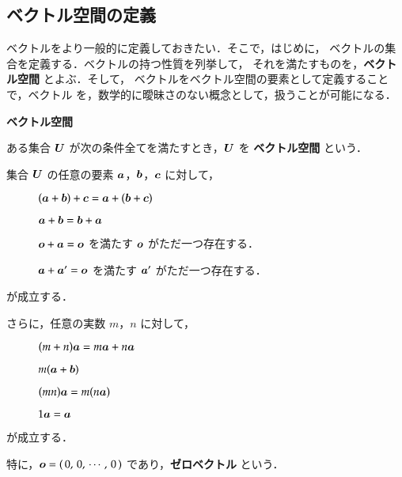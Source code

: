            \subsection{ベクトル空間の定義}
                ベクトルをより一般的に定義しておきたい．そこで，はじめに，
                ベクトルの集合を定義する．ベクトルの持つ性質を列挙して，
                それを満たすものを，\textbf{ベクトル空間} とよぶ．そして，
                ベクトルをベクトル空間の要素として定義することで，ベクトル
                を，数学的に曖昧さのない概念として，扱うことが可能になる．
                    \\
                    \begin{itembox}[l]{\textbf{ベクトル空間}}
                        \begin{dfn}
                            ある集合 $\boldsymbol{U}$ が次の条件全てを満たすとき，$\boldsymbol{U}$ を \textbf{ベクトル空間} という．

                                集合 $\boldsymbol{U}$ の任意の要素 $\boldsymbol{a}$，$\boldsymbol{b}$，$\boldsymbol{c}$ に対して，
                                \begin{description}
                                    \item[\;\;]\;\;\; $(\boldsymbol{a} + \boldsymbol{b}) + \boldsymbol{c} = \boldsymbol{a} + (\boldsymbol{b} + \boldsymbol{c}) $
                                    \item[\;\;]\;\;\; $\boldsymbol{a} + \boldsymbol{b} = \boldsymbol{b} + \boldsymbol{a}$
                                    \item[\;\;]\;\;\; $\boldsymbol{o} + \boldsymbol{a} = \boldsymbol{o}$ を満たす $\boldsymbol{o}$ がただ一つ存在する．
                                    \item[\;\;]\;\;\; $\boldsymbol{a} + \boldsymbol{a}' = \boldsymbol{o}$ を満たす $\boldsymbol{a}'$ がただ一つ存在する．
                                \end{description}
                                が成立する．

                                さらに，任意の実数 $m$，$n$ に対して，
                                \begin{description}
                                    \item[\;\;]\;\;\; $(m + n) \boldsymbol{a} = m\boldsymbol{a} + n\boldsymbol{a}$
                                    \item[\;\;]\;\;\; $m( \boldsymbol{a} + \boldsymbol{b} )$
                                    \item[\;\;]\;\;\; $(mn)\boldsymbol{a} = m(n\boldsymbol{a})$
                                    \item[\;\;]\;\;\; $1\boldsymbol{a} = \boldsymbol{a}$
                                \end{description}
                                が成立する．

                            特に，$\boldsymbol{o} = (\,0,\,0,\, \cdots,\,0\,)$ であり，\textbf{ゼロベクトル} という．
                        \end{dfn}
                    \end{itembox}
                    \\

